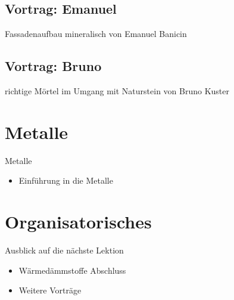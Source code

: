 \subsection{Vortrag: Emanuel}
\begin{frame}{Fassadenaufbau mineralisch}
    von Emanuel Banicin
\end{frame}

\subsection{Vortrag: Bruno}
\begin{frame}{richtige Mörtel im Umgang mit Naturstein}
    von Bruno Kuster
\end{frame}










\section{Metalle}
\BlueSectionSlide

\begin{frame}{Metalle}
\begin{itemize}
    \item[\textbullet] Einführung in die Metalle
\end{itemize}
\end{frame}






\section{Organisatorisches}
\BlueSectionSlide







\begin{frame}{Ausblick auf die nächste Lektion}
\begin{itemize}
    \item[\textbullet] Wärmedämmstoffe Abschluss 
    \item[\textbullet] Weitere Vorträge
\end{itemize}
\end{frame}



